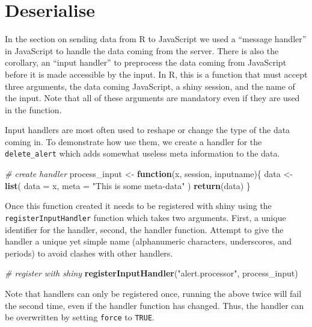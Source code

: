 \documentclass[
]{krantz}
\makeatletter
\newenvironment{Shaded}{\begin{snugshade}}{\end{snugshade}}
\newcommand{\CommentTok}[1]{\textcolor[rgb]{0.37,0.37,0.37}{\textit{#1}}}
\newcommand{\ControlFlowTok}[1]{\textcolor[rgb]{0.27,0.27,0.27}{\textbf{#1}}}
\newcommand{\DataTypeTok}[1]{\textcolor[rgb]{0.27,0.27,0.27}{#1}}
\newcommand{\KeywordTok}[1]{\textcolor[rgb]{0.27,0.27,0.27}{\textbf{#1}}}
\newcommand{\NormalTok}[1]{#1}
\newcommand{\StringTok}[1]{\textcolor[rgb]{0.5,0.5,0.5}{#1}}
\newenvironment{kframe}{%
\medskip{}
\setlength{\fboxsep}{.8em}
 \def\at@end@of@kframe{}%
 \ifinner\ifhmode%
  \def\at@end@of@kframe{\end{minipage}}%
  \begin{minipage}{\columnwidth}%
 \fi\fi%
 \def\FrameCommand##1{\hskip\@totalleftmargin \hskip-\fboxsep
 \colorbox{shadecolor}{##1}\hskip-\fboxsep
     \hskip-\linewidth \hskip-\@totalleftmargin \hskip\columnwidth}%
 \MakeFramed {\advance\hsize-\width
   \@totalleftmargin\z@ \linewidth\hsize
   \@setminipage}}%
 {\par\unskip\endMakeFramed%
 \at@end@of@kframe}
\renewenvironment{Shaded}{\begin{kframe}}{\end{kframe}}
\makeatother
\begin{document}
\hypertarget{deserialise}{%
\section{Deserialise}\label{deserialise}}

In the section on sending data from R to JavaScript we used a ``message handler'' in JavaScript to handle the data coming from the server. There is also the corollary, an ``input handler'' to preprocess the data coming from JavaScript before it is made accessible by the input. In R, this is a function that must accept three arguments, the data coming JavaScript, a shiny session, and the name of the input. Note that all of these arguments are mandatory even if they are used in the function.

Input handlers are most often used to reshape or change the type of the data coming in. To demonstrate how use them, we create a handler for the \texttt{delete\_alert} which adds somewhat useless meta information to the data.

\begin{Shaded}
\begin{Highlighting}[]
\CommentTok{\# create handler}
\NormalTok{process\_input <{-}}\StringTok{ }\ControlFlowTok{function}\NormalTok{(x, session, inputname)\{}
\NormalTok{  data <{-}}\StringTok{ }\KeywordTok{list}\NormalTok{(}
    \DataTypeTok{data =}\NormalTok{ x,}
    \DataTypeTok{meta =} \StringTok{"This is some meta{-}data"}
\NormalTok{  )}
  \KeywordTok{return}\NormalTok{(data)}
\NormalTok{\}}
\end{Highlighting}
\end{Shaded}

Once this function created it needs to be registered with shiny using the \texttt{registerInputHandler} function which takes two arguments. First, a unique identifier for the handler, second, the handler function. Attempt to give the handler a unique yet simple name (alphanumeric characters, underscores, and periods) to avoid clashes with other handlers.

\begin{Shaded}
\begin{Highlighting}[]
\CommentTok{\# register with shiny}
\KeywordTok{registerInputHandler}\NormalTok{(}\StringTok{"alert.processor"}\NormalTok{, process\_input)}
\end{Highlighting}
\end{Shaded}

Note that handlers can only be registered once, running the above twice will fail the second time, even if the handler function has changed. Thus, the handler can be overwritten by setting \texttt{force} to \texttt{TRUE}.
\end{document}
